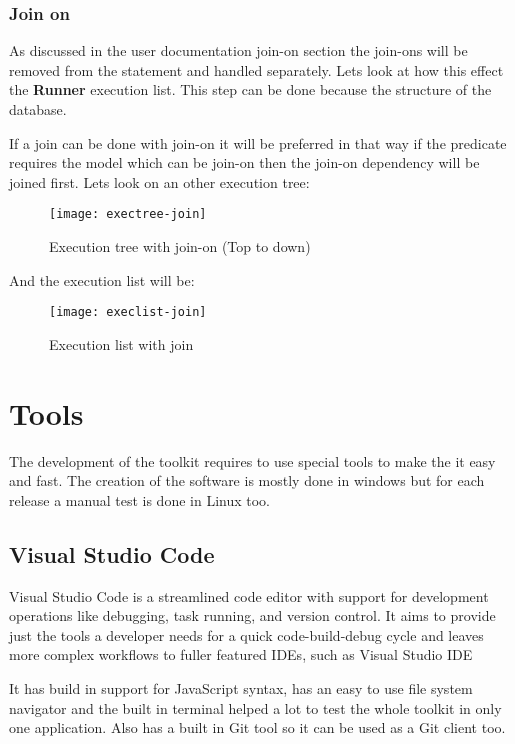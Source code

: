 \newpage
\subsubsection{Join on}
As discussed in the user documentation join-on section the join-ons will be removed from the statement and handled separately. Lets look at how this effect the \textbf{Runner} execution list. This step can be done because the structure of the database.

If a join can be done with join-on it will be preferred in that way if the predicate requires the model which can be join-on then the join-on dependency will be joined first. Lets look on an other execution tree:

 \begin{figure}[H]
	\centering
	\texttt{[image: exectree-join]}
	\caption{Execution tree with join-on (Top to down)}
	\label{fig:fig-tree}
\end{figure}

And the execution list will be:

\begin{figure}[H]
	\centering
	\texttt{[image: execlist-join]}
	\caption{Execution list with join}
	\label{fig:fig-joine}
\end{figure}

\section{Tools}

The development of the toolkit requires to use special tools to make the it easy and fast. The creation of the software is mostly done in windows but for each release a manual test is done in Linux too.

\subsection{Visual Studio Code}

Visual Studio Code is a streamlined code editor with support for development operations like debugging, task running, and version control. It aims to provide just the tools a developer needs for a quick code-build-debug cycle and leaves more complex workflows to fuller featured IDEs, such as Visual Studio IDE\cite{vscode}

It has build in support for JavaScript syntax, has an easy to use file system navigator and the built in terminal helped a lot to test the whole toolkit in only one application. Also has a built in Git tool so it can be used as a Git client too.

